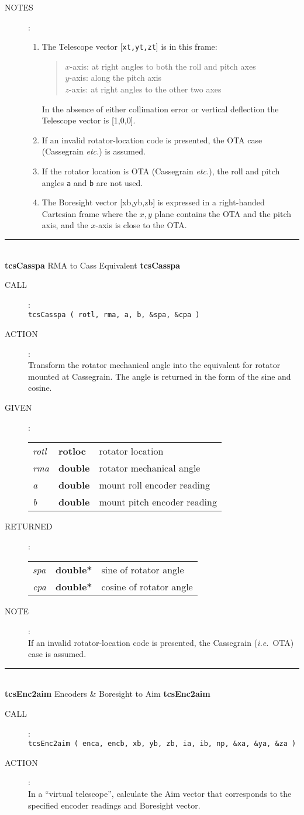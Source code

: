 \documentclass[12pt,fleqn,twoside]{article}
\renewcommand{\_}{{\tt\char'137}}     %
\newcommand{\routine}[2]
{
  \newpage
  \rule{\textwidth}{0.3mm}\\ \nopagebreak
  {\Large {\bf #1} \hfill #2 \hfill {\bf #1}}
  \vspace{-1ex}
}
\newcommand{\call}[1]
{
  \goodbreak
  \begin{description}
    \item[CALL]: \\[0.5ex] \nopagebreak
        {\tt #1}
  \end{description}
  \vspace{-3ex}
}
\newcommand{\action}[1]
{
  \goodbreak
  \begin{description}
    \item[ACTION]: \\[0.5ex] \nopagebreak
        #1
  \end{description}
  \vspace{-3ex}
}
\newcommand{\args}[2]
{
  \goodbreak
  \begin{description}
  \item[#1]: \\[1.5ex] \nopagebreak
    \hspace*{-0.9em}
    \begin{tabular}{p{4.5em}p{5.8em}p{23.5em}}
      #2
    \end{tabular}
  \end{description}
  \vspace{-3ex}
}
\newcommand{\spec}[3]
{
  {\em {#1}} & {\bf \mbox{#2}} & {#3}
}
\newcommand{\anote}[1]
{
  \goodbreak
  \begin{description}
    \item[NOTE]: \\[0.5ex] \nopagebreak
        #1
  \end{description}
  \vspace{-3ex}
}
\newcommand{\notes}[1]
{
  \goodbreak
  \begin{description}
    \item[NOTES]: \nopagebreak
        #1
  \end{description}
  \vspace{-3ex}
}
\begin{document}
\notes{
\begin{enumerate}
\setlength{\parskip}{\medskipamount}
\item The {\sc Telescope} vector [{\tt xt,yt,zt}] is in this frame:
      \begin{quote}
      $x$-axis:  at right angles to both the roll and pitch axes \\
      $y$-axis:  along the pitch axis \\
      $z$-axis:  at right angles to the other two axes
      \end{quote}
      In the absence of either collimation error or vertical deflection
      the {\sc Telescope} vector is [1,0,0].
\item If an invalid rotator-location code is presented, the OTA case
      (Cassegrain {\it etc.}) is assumed.
\item If the rotator location is OTA
      (Cassegrain {\it etc.}), the roll and pitch angles
      {\tt a} and {\tt b} are not used.
\item The {\sc Boresight} vector [xb,yb,zb] is expressed in a right-handed
      Cartesian frame where the $x,y$ plane contains the OTA and the
      pitch axis, and the $x$-axis is close to the OTA.
\end{enumerate}
}
\routine{tcsCasspa}{RMA to Cass Equivalent}
\label{tcsCasspa}
\call{tcsCasspa ( rotl, rma, a, b, \&spa, \&cpa )}
\action{ Transform the rotator mechanical angle into the equivalent for
         rotator mounted at Cassegrain.  The angle is returned in the form
         of the sine and cosine.}
\args{GIVEN}
{
\spec{rotl}{\sc rotloc}{rotator location} \\
\spec{rma }{double}{rotator mechanical angle} \\
\spec{a}{double}{mount roll encoder reading} \\
\spec{b}{double}{mount pitch encoder reading}
}
\args{RETURNED}
{
\spec{spa}{double*}{sine of rotator angle} \\
\spec{cpa}{double*}{cosine of rotator angle}
}
\anote{If an invalid rotator-location code is presented, the
       Cassegrain ({\it i.e.}~OTA) case is assumed.}
\routine{tcsEnc2aim}{Encoders \& {\sc Boresight} to {\sc Aim}}
\label{tcsEnc2aim}
\call{tcsEnc2aim ( enca, encb, xb, yb, zb, ia, ib, np, \&xa, \&ya, \&za )}
\action{In a ``virtual telescope'', calculate the {\sc Aim} vector
        that corresponds to the specified encoder readings and
        {\sc Boresight} vector.}
\end{document}
